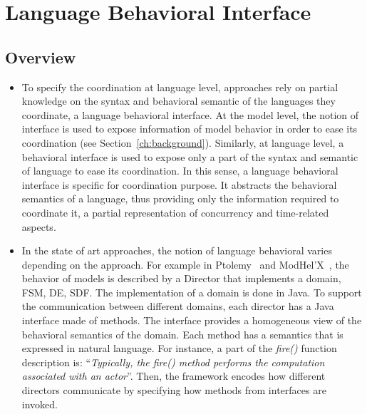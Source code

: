 \section{Language Behavioral Interface}
	\subsection{Overview}
	\begin{itemize}
		\item To specify the coordination at language level, approaches rely on partial knowledge on the syntax and behavioral semantic of the languages they coordinate, \ie a language behavioral interface. At the model level, the notion of interface is used to expose information of model behavior in order to ease its coordination (see Section~\ref{ch:background}). Similarly, at language level, a behavioral interface is used to expose only a part of the syntax and semantic of language to ease its coordination. In this sense, a language behavioral interface is specific for coordination purpose. It abstracts the behavioral semantics of a language, thus providing only the information required to coordinate it, \ie a partial representation of concurrency and time-related aspects.   
		
		\item In the state of art approaches, the notion of language behavioral varies depending on the approach. For example in Ptolemy~\cite{ptoleframebib} and ModHel'X~\cite{modhelxbib}, the behavior of models is described by a Director that implements a domain, \eg FSM, DE, SDF. The implementation of a domain is done in Java. To support the communication between different domains, each director has a Java interface made of methods. The interface provides a homogeneous view of the behavioral semantics of the domain. Each method has a semantics that is expressed in natural language. For instance, a part of the \emph{fire()} function description is: ``\emph{Typically, the fire() method performs the computation associated with an actor}''. Then, the framework encodes how different directors communicate by specifying how methods from interfaces are invoked. 
		

\end{itemize}
